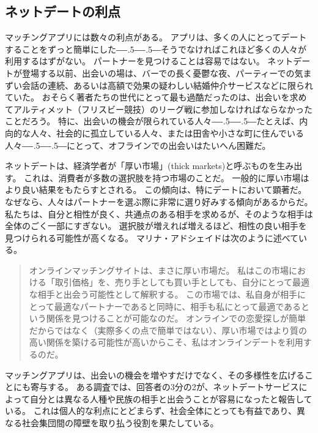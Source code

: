 \documentclass[paper=a4,book,openany]{jlreq}
\def\DDASH{―\kern-.5\zw―\kern-.5\zw―} %
\begin{document}
\subsection{ネットデートの利点}

マッチングアプリには数々の利点がある。
アプリは、多くの人にとってデートすることをずっと簡単にした{\DDASH}そうでなければこれほど多くの人々が利用するはずがない。
パートナーを見つけることは容易ではない。
ネットデートが登場する以前、出会いの場は、バーでの長く憂鬱な夜、パーティーでの気まずい会話の連続、あるいは高額で効果の疑わしい結婚仲介サービスなどに限られていた。
おそらく著者たちの世代にとって最も過酷だったのは、出会いを求めてアルティメット（フリスビー競技）のリーグ戦に参加しなければならなかったことだろう。
特に、出会いの機会が限られている人々{\DDASH}たとえば、内向的な人々、社会的に孤立している人々、または田舎や小さな町に住んでいる人々{\DDASH}にとって、オフラインでの出会いはたいへん困難だ。

ネットデートは、経済学者が「厚い市場」(thick markets)と呼ぶものを生み出す。
これは、消費者が多数の選択肢を持つ市場のことだ。
一般的に厚い市場はより良い結果をもたらすとされる。
この傾向は、特にデートにおいて顕著だ。
なぜなら、人々はパートナーを選ぶ際に非常に選り好みする傾向があるからだ。
私たちは、自分と相性が良く、共通点のある相手を求めるが、そのような相手は全体のごく一部にすぎない。
選択肢が増えれば増えるほど、相性の良い相手を見つけられる可能性が高くなる。
マリナ・アドシェイドは次のように述べている。

\begin{quote}
  オンラインマッチングサイトは、まさに厚い市場だ。
私はこの市場における「取引価格」を、売り手としても買い手としても、自分にとって最適な相手と出会う可能性として解釈する。
この市場では、私自身が相手にとって最適なパートナーであると同時に、相手も私にとって最適であるという関係を見つけることが可能なのだ。
オンラインでの恋愛探しが簡単だからではなく（実際多くの点で簡単ではない）、厚い市場ではより質の高い関係を築ける可能性が高いからこそ、私はオンラインデートを利用するのだ。
\citep[p.8]{adshade13:_dollar_sex}

\end{quote}

マッチングアプリは、出会いの機会を増やすだけでなく、その多様性を広げることにも寄与する。
ある調査では、回答者の3分の2が、ネットデートサービスによって自分とは異なる人種や民族の相手と出会うことが容易になったと報告している\citep{hergovich17:_stren_absen_ties}。
これは個人的な利点にとどまらず、社会全体にとっても有益であり、異なる社会集団間の障壁を取り払う役割を果たしている。
\end{document}
